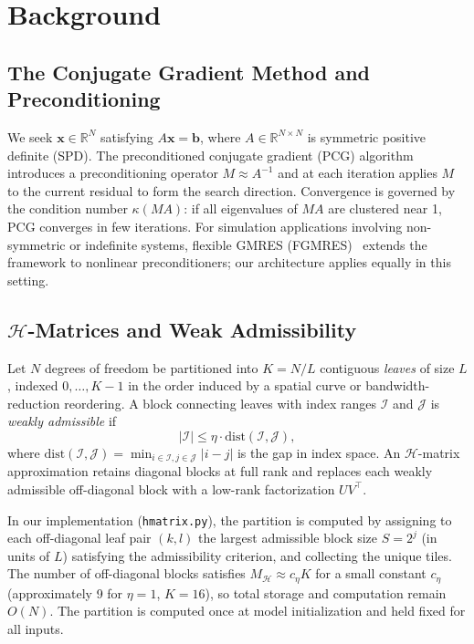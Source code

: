 \documentclass[acmtog,anonymous,review]{acmart}
\begin{document}
\section{Background}
\label{sec:background}

\subsection{The Conjugate Gradient Method and Preconditioning}

We seek $\mathbf{x} \in \mathbb{R}^N$ satisfying $A\mathbf{x} = \mathbf{b}$, where
$A \in \mathbb{R}^{N \times N}$ is symmetric positive definite (SPD).  The preconditioned
conjugate gradient (PCG) algorithm introduces a preconditioning operator $M \approx A^{-1}$ and
at each iteration applies $M$ to the current residual to form the search direction.  Convergence
is governed by the condition number $\kappa(MA)$: if all eigenvalues of $MA$ are clustered near
1, PCG converges in few iterations.  For simulation applications involving non-symmetric or
indefinite systems, flexible GMRES (FGMRES)~\cite{saad1993flexible,chen2024gnp} extends the
framework to nonlinear preconditioners; our architecture applies equally in this setting.

\subsection{\texorpdfstring{$\mathcal{H}$}{H}-Matrices and Weak Admissibility}
\label{sec:background:hmatrix}

Let $N$ degrees of freedom be partitioned into $K = N/L$ contiguous \emph{leaves} of size $L$,
indexed $0, \ldots, K-1$ in the order induced by a spatial curve or bandwidth-reduction
reordering.  A block connecting leaves with index ranges $\mathcal{I}$ and $\mathcal{J}$ is
\emph{weakly admissible} if
\[
  |\mathcal{I}| \leq \eta \cdot \mathrm{dist}(\mathcal{I}, \mathcal{J}),
\]
where $\mathrm{dist}(\mathcal{I}, \mathcal{J}) = \min_{i \in \mathcal{I}, j \in \mathcal{J}}
|i - j|$ is the gap in index space.  An $\mathcal{H}$-matrix approximation retains diagonal
blocks at full rank and replaces each weakly admissible off-diagonal block with a low-rank
factorization $UV^\top$.

In our implementation (\texttt{hmatrix.py}), the partition is computed by assigning to each
off-diagonal leaf pair $(k, l)$ the largest admissible block size $S = 2^j$ (in units of $L$)
satisfying the admissibility criterion, and collecting the unique tiles.  The number of
off-diagonal blocks satisfies $M_\mathcal{H} \approx c_\eta K$ for a small constant $c_\eta$
(approximately 9 for $\eta = 1$, $K = 16$), so total storage and computation remain $O(N)$.  The
partition is computed once at model initialization and held fixed for all inputs.
\end{document}

